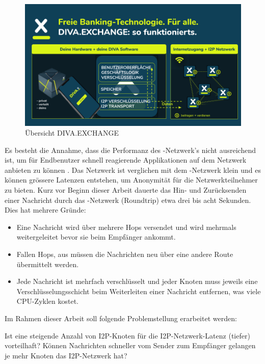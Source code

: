 \begin{figure}[thp!]
    \includegraphics[width=1.0\textwidth]{img/divax-overview.png}
    \caption{Übersicht DIVA.EXCHANGE}\label{fig:divax_overview}
\end{figure}

Es besteht die Annahme, dass die Performanz des -Netzwerk's nicht ausreichend ist, um für Endbenutzer schnell reagierende Applikationen auf dem Netzwerk anbieten zu können \parencite[S. 1]{abou-tair_usability_2009}.
Das Netzwerk ist verglichen mit dem -Netzwerk klein und es können grössere Latenzen entstehen, um Anonymität für die Netzwerkteilnehmer zu bieten.
Kurz vor Beginn dieser Arbeit dauerte das Hin- und Zurücksenden einer Nachricht durch das -Netzwerk (Roundtrip) etwa drei bis acht Sekunden. Dies hat mehrere Gründe:

\begin{itemize}
    \item Eine Nachricht wird über mehrere Hops versendet und wird mehrmals weitergeleitet bevor sie beim Empfänger ankommt.
    \item Fallen Hops, aus müssen die Nachrichten neu über eine andere Route übermittelt werden.
    \item Jede Nachricht ist mehrfach verschlüsselt und jeder Knoten muss jeweils eine Verschlüsselungsschicht beim Weiterleiten einer Nachricht entfernen, was viele CPU-Zyklen kostet.
\end{itemize}

Im Rahmen dieser Arbeit soll folgende Problemstellung erarbeitet werden:

\begin{hyp} \label{hyp:first}
    Ist eine steigende Anzahl von I2P-Knoten für die I2P-Netzwerk-Latenz (tiefer) vorteilhaft?
    Können Nachrichten schneller vom Sender zum Empfänger gelangen je mehr Knoten das I2P-Netzwerk hat?
\end{hyp}

